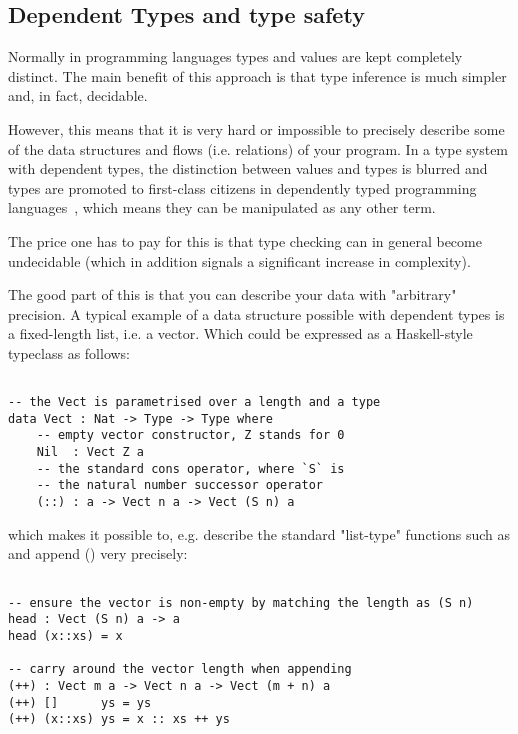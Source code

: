 \subsection{Dependent Types and type safety}

Normally in programming languages types and values are kept completely
distinct. The main benefit of this approach is that type inference is much
simpler and, in fact, decidable.

However, this means that it is very hard or impossible to precisely
describe some of the data structures and flows (i.e. relations) of your
program. In a type system with dependent types, the distinction between values
and types is blurred and types are promoted to first-class citizens in
dependently typed programming languages~\cite[p.~3]{idris-tutorial}, which
means they can be manipulated as any other term.

The price one has to pay for this is that type checking can in general become
undecidable (which in addition signals a significant increase in complexity).

The good part of this is that you can describe your data with "arbitrary"
precision. A typical example of a data structure possible with dependent types
is a fixed-length list, i.e. a vector. Which could be expressed as
a Haskell-style typeclass as follows:

\begin{BVerbatim}

-- the Vect is parametrised over a length and a type
data Vect : Nat -> Type -> Type where
    -- empty vector constructor, Z stands for 0
    Nil  : Vect Z a
    -- the standard cons operator, where `S` is
    -- the natural number successor operator
    (::) : a -> Vect n a -> Vect (S n) a

\end{BVerbatim}

which makes it possible to, e.g. describe the standard "list-type" functions
such as  and append (\code{++}) very precisely:

\begin{BVerbatim}

-- ensure the vector is non-empty by matching the length as (S n)
head : Vect (S n) a -> a
head (x::xs) = x

-- carry around the vector length when appending
(++) : Vect m a -> Vect n a -> Vect (m + n) a
(++) []      ys = ys
(++) (x::xs) ys = x :: xs ++ ys

\end{BVerbatim}

